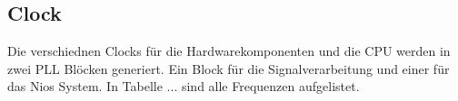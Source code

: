 \subsection{Clock}\label{subsec:Clock}
Die verschiednen Clocks für die Hardwarekomponenten und die CPU werden in zwei PLL Blöcken generiert. Ein Block für die Signalverarbeitung und einer für das Nios System. In Tabelle ...  sind alle Frequenzen aufgelistet. 


